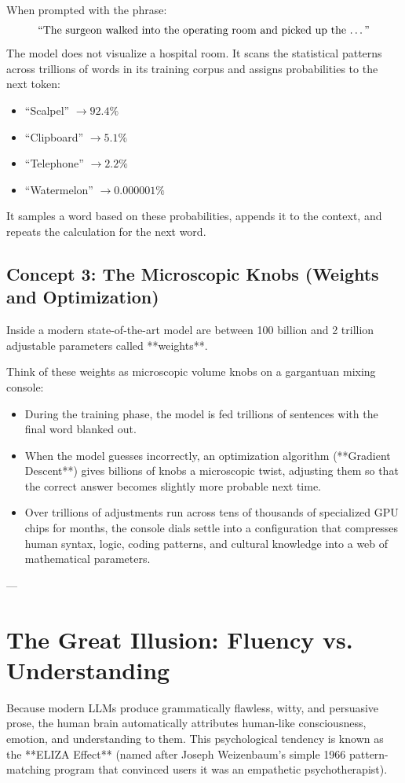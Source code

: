 \documentclass[11pt,journal,onecolumn]{IEEEtran}
\begin{document}
When prompted with the phrase:
$$\text{``The surgeon walked into the operating room and picked up the \dots''}$$
The model does not visualize a hospital room. It scans the statistical patterns across trillions of words in its training corpus and assigns probabilities to the next token:
\begin{itemize}
    \item ``Scalpel'' $\rightarrow 92.4\%$
    \item ``Clipboard'' $\rightarrow 5.1\%$
    \item ``Telephone'' $\rightarrow 2.2\%$
    \item ``Watermelon'' $\rightarrow 0.000001\%$
\end{itemize}
It samples a word based on these probabilities, appends it to the context, and repeats the calculation for the next word.

\subsection{Concept 3: The Microscopic Knobs (Weights and Optimization)}
Inside a modern state-of-the-art model are between 100 billion and 2 trillion adjustable parameters called **weights**.

Think of these weights as microscopic volume knobs on a gargantuan mixing console:
\begin{itemize}
    \item During the training phase, the model is fed trillions of sentences with the final word blanked out.
    \item When the model guesses incorrectly, an optimization algorithm (**Gradient Descent**) gives billions of knobs a microscopic twist, adjusting them so that the correct answer becomes slightly more probable next time.
    \item Over trillions of adjustments run across tens of thousands of specialized GPU chips for months, the console dials settle into a configuration that compresses human syntax, logic, coding patterns, and cultural knowledge into a web of mathematical parameters.
\end{itemize}

---

\section{The Great Illusion: Fluency vs. Understanding}
\label{sec:illusion}

Because modern LLMs produce grammatically flawless, witty, and persuasive prose, the human brain automatically attributes human-like consciousness, emotion, and understanding to them. This psychological tendency is known as the **ELIZA Effect** (named after Joseph Weizenbaum's simple 1966 pattern-matching program that convinced users it was an empathetic psychotherapist).
\end{document}
